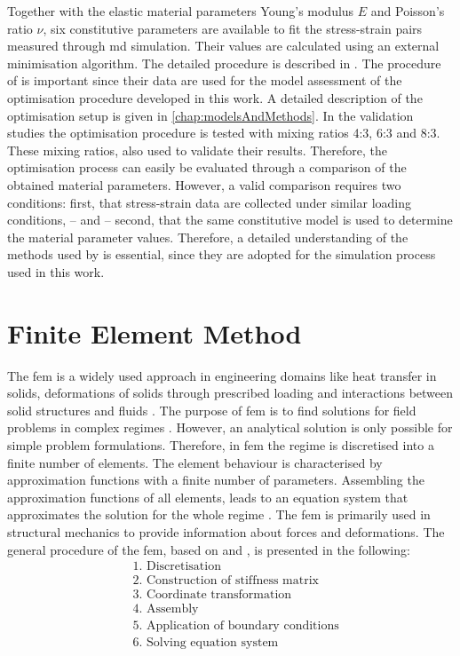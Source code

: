 Together with the elastic material parameters Young's modulus $E$ and Poisson's ratio $\nu$, six constitutive parameters are available to fit the stress-strain pairs measured through \acrshort{md} simulation. Their values are calculated using an external minimisation algorithm. The detailed procedure is described in \cite{ries_deciphering_nodate}. The procedure of \citet{ries_deciphering_nodate} is important since their data are used for the model assessment of the optimisation procedure developed in this work. A detailed description of the optimisation setup is given in \autoref{chap:modelsAndMethods}. In the validation studies the optimisation procedure is tested with mixing ratios 4:3, 6:3 and 8:3. These mixing ratios, \citet{ries_deciphering_nodate} also used to validate their results. Therefore, the optimisation process can easily be evaluated through a comparison of the obtained material parameters. However, a valid comparison requires two conditions: first, that stress-strain data are collected under similar loading conditions, – and – second, that the same constitutive model is used to determine the material parameter values. Therefore, a detailed understanding of the methods used by \citet{ries_deciphering_nodate} is essential, since they are adopted for the simulation process used in this work.  



\section{Finite Element Method} \label{sec: FEMBasics}

The \acrfull{fem} is a widely used approach in engineering domains like heat transfer in solids, deformations of solids through prescribed loading and interactions between solid structures and fluids \cite{jung_methode_2013}. 
The purpose of \acrshort{fem} is to find solutions for field problems in complex regimes \cite{willner_vorlesungsskript_nodate}. However, an analytical solution is only possible for simple problem formulations. Therefore, in \acrshort{fem} the regime is discretised into a finite number of elements. The element behaviour is characterised by approximation functions with a finite number of parameters. Assembling the approximation functions of all elements, leads to an equation system that approximates the solution for the whole regime \cite{jagota_finite_nodate}. The \acrshort{fem} is primarily used in structural mechanics to provide information about forces and deformations. The general procedure of the \acrshort{fem}, based on \citet{willner_vorlesungsskript_nodate} and \citet{steinke_finite-elemente-methode_2015}, is presented in the following: 
\begin{align*}
    &\text{1. Discretisation} \\
    &\text{2. Construction of stiffness matrix}\\ 
    &\text{3. Coordinate transformation} \\
    &\text{4. Assembly} \\
    &\text{5. Application of boundary conditions} \\
    &\text{6. Solving equation system}
\end{align*}

